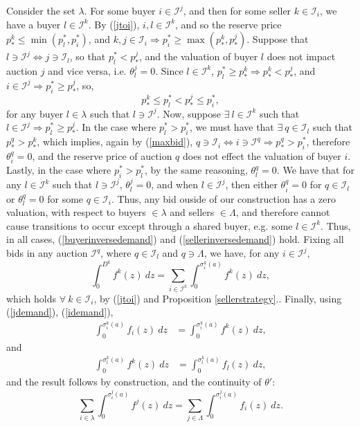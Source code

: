 \documentclass[12pt]{article}
\theoremstyle{definition}
\newcommand{\mcI}{\mathcal{I}}
\newcommand{\g}{\sigma}
\begin{document}
\begin{multicols}{2}
Consider the set $\lambda$. For some buyer $i\in\mcI^j$, and then for
some seller $k \in \mcI_i$, we have a buyer $l \in \mcI^k$. By (\ref{jtoi}), $i,l \in \mcI^k$, and so the reserve price $p_*^k \le \min(p_l^*,
p_i^*)$, and $k, j\in \mcI_i\Rightarrow p_i^* \ge \max(p_*^k, p_*^j)$.
Suppose that $l \ni \mcI^j\Leftrightarrow j \ni \mcI_l$, so
that $p_l^* < p_*^j$, and
the valuation of buyer $l$ does not impact auction $j$ and vice versa, i.e. $\theta_l^j = 0$. Since $l\in\mcI^k$, $p_l^* \ge p_*^k\Rightarrow
p_*^k < p_*^j$, and $i\in\mcI^j \Rightarrow p_i^* \ge p_*^j$, so,
$$
    p_*^k \le p_l^* < p_*^j \le p_i^*,
$$
for any buyer $l\in\lambda$ such that $l\ni \mcI^j$. Now, suppose $\exists \ l\in\mcI^k$ such that $l\in\mcI^j \Rightarrow p_l^* \ge
p_*^j$. In the case where $p_l^* > p_i^*$, we must have that 
$\exists \ q \in \mcI_l$ such that $p_*^q > p_*^k$, %
which implies, again by (\ref{maxbid}), $q\ni\mcI_i \Leftrightarrow i
\ni\mcI^q \Rightarrow p_*^q >
p_i^*$, therefore $\theta_i^q = 0$, and the reserve price of auction $q$ does not effect the valuation of
buyer $i$. 
Lastly, in the case where $p_i^* > p_l^*$, by the same reasoning, $\theta_l^q = 0$.
We have that for any $l\in\mcI^k$ such that $l\ni
\mcI^j$, $\theta_l^j =0$, and when $l\in \mcI^j$, then either $\theta_i^q =0$
for $q\in\mcI_l$ or $\theta_l^q = 0$ for some $q\in\mcI_i$. Thus, any bid ouside of
our construction
has a zero valuation, with respect to buyers $\in\lambda$ and sellers
$\in\Lambda$, and therefore cannot cause transitions to occur except through a
shared buyer, e.g. some $l\in\mcI^k$. Thus, in all cases,
(\ref{buyerinversedemand}) and (\ref{sellerinversedemand}) hold. Fixing all
bids in any auction $\mcI^q$, where $q\in \mcI_l$ and $q\ni \Lambda$,
we have, for any $i\in\mcI^j$,
\begin{equation}\label{idemand}
    \displaystyle\int_0^{D^k} f^k(z) \ dz = \sum_{i\in\mcI^k}\int_0^{\g_i^k(a)}
f^k(z) \ dz,
\end{equation}
which holds $\forall \ k\in\mcI_i$, by (\ref{jtoi}) and Proposition
\ref{sellerstrategy}..
Finally, using (\ref{jdemand}), (\ref{idemand}), 
\begin{align*}
    \int_0^{\g_i^k(a)} f_i(z) \ dz &= \int_0^{\g_i^k(a)} f^k(z) \ dz,
\end{align*}
and
\begin{align*}
    \int_0^{\g_l^k(a)} f^k(z) \ dz &= \int_0^{\g_l^k(a)} f_l(z) \ dz,
\end{align*}
and the result follows by construction, and the continuity of $\theta'$:
\begin{equation}
    \sum_{i\in\lambda}\int_0^{\g_i^j(a)} f^j(z) \ dz = \sum_{j\in\Lambda}\int_0^{\g_i^j(a)} f_i(z) \ dz.
\end{equation}


\end{multicols}
\end{document}
